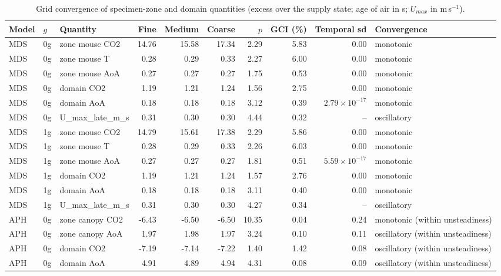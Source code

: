 \begin{table}[htbp]\centering\scriptsize
\caption{Grid convergence \citep{celik2008} of specimen-zone and domain quantities (excess over the supply state; age of air in s; $U_{max}$ in m\,s$^{-1}$).}\label{tab:gci}
\begin{adjustbox}{max width=\linewidth}
\begin{tabular}{lllrrrrrrl}
\toprule
Model & $g$ & Quantity & Fine & Medium & Coarse & $p$ & GCI (\%) & Temporal sd & Convergence \\
\midrule
MDS & 0g & zone mouse CO2 & 14.76 & 15.58 & 17.34 & 2.29 & 5.83 & 0.00 & monotonic \\
MDS & 0g & zone mouse T & 0.28 & 0.29 & 0.33 & 2.27 & 6.00 & 0.00 & monotonic \\
MDS & 0g & zone mouse AoA & 0.27 & 0.27 & 0.27 & 1.75 & 0.53 & 0.00 & monotonic \\
MDS & 0g & domain CO2 & 1.19 & 1.21 & 1.24 & 1.56 & 2.75 & 0.00 & monotonic \\
MDS & 0g & domain AoA & 0.18 & 0.18 & 0.18 & 3.12 & 0.39 & $2.79\times10^{-17}$ & monotonic \\
MDS & 0g & U\_max\_late\_m\_s & 0.31 & 0.30 & 0.30 & 4.44 & 0.32 & -- & oscillatory \\
MDS & 1g & zone mouse CO2 & 14.79 & 15.61 & 17.38 & 2.29 & 5.86 & 0.00 & monotonic \\
MDS & 1g & zone mouse T & 0.28 & 0.29 & 0.33 & 2.26 & 6.03 & 0.00 & monotonic \\
MDS & 1g & zone mouse AoA & 0.27 & 0.27 & 0.27 & 1.81 & 0.51 & $5.59\times10^{-17}$ & monotonic \\
MDS & 1g & domain CO2 & 1.19 & 1.21 & 1.24 & 1.57 & 2.76 & 0.00 & monotonic \\
MDS & 1g & domain AoA & 0.18 & 0.18 & 0.18 & 3.11 & 0.40 & 0.00 & monotonic \\
MDS & 1g & U\_max\_late\_m\_s & 0.31 & 0.30 & 0.30 & 4.27 & 0.34 & -- & oscillatory \\
APH & 0g & zone canopy CO2 & -6.43 & -6.50 & -6.50 & 10.35 & 0.04 & 0.24 & monotonic (within unsteadiness) \\
APH & 0g & zone canopy AoA & 1.97 & 1.98 & 1.97 & 3.24 & 0.10 & 0.11 & oscillatory (within unsteadiness) \\
APH & 0g & domain CO2 & -7.19 & -7.14 & -7.22 & 1.40 & 1.42 & 0.08 & oscillatory (within unsteadiness) \\
APH & 0g & domain AoA & 4.91 & 4.89 & 4.94 & 4.31 & 0.08 & 0.09 & oscillatory (within unsteadiness) \\

\end{tabular}
\end{adjustbox}
\end{table}
